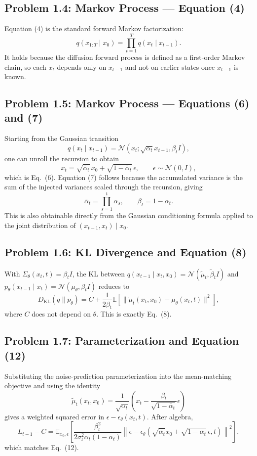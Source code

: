 \documentclass[11pt]{article}
\begin{document}
\subsection*{Problem 1.4: Markov Process --- Equation (4)}
Equation (4) is the standard forward Markov factorization:
\[
q(x_{1:T}\mid x_0)=\prod_{t=1}^T q(x_t\mid x_{t-1}).
\]
It holds because the diffusion forward process is defined as a first-order Markov chain, so each $x_t$ depends only on $x_{t-1}$ and not on earlier states once $x_{t-1}$ is known.

\subsection*{Problem 1.5: Markov Process --- Equations (6) and (7)}
Starting from the Gaussian transition
\[
q(x_t\mid x_{t-1})=\mathcal{N}(x_t;\sqrt{\alpha_t}x_{t-1},\beta_t I),
\]
one can unroll the recursion to obtain
\[
x_t=\sqrt{\bar\alpha_t}\,x_0+\sqrt{1-\bar\alpha_t}\,\epsilon,\qquad \epsilon\sim\mathcal{N}(0,I),
\]
which is Eq.\ (6). Equation (7) follows because the accumulated variance is the sum of the injected variances scaled through the recursion, giving
\[
\bar\alpha_t=\prod_{s=1}^t \alpha_s,\qquad \beta_t=1-\alpha_t.
\]
This is also obtainable directly from the Gaussian conditioning formula applied to the joint distribution of $(x_{t-1},x_t)\mid x_0$.

\subsection*{Problem 1.6: KL Divergence and Equation (8)}
With $\Sigma_\theta(x_t,t)=\beta_t I$, the KL between $q(x_{t-1}\mid x_t,x_0)=\mathcal{N}(\tilde\mu_t,\tilde\beta_t I)$ and $p_\theta(x_{t-1}\mid x_t)=\mathcal{N}(\mu_\theta,\beta_t I)$ reduces to
\[
D_{\mathrm{KL}}(q\|p_\theta)
= C + \frac{1}{2\beta_t}\mathbb{E}\left[\|\tilde\mu_t(x_t,x_0)-\mu_\theta(x_t,t)\|^2\right],
\]
where $C$ does not depend on $\theta$. This is exactly Eq.\ (8).

\subsection*{Problem 1.7: Parameterization and Equation (12)}
Substituting the noise-prediction parameterization into the mean-matching objective and using the identity
\[
\tilde\mu_t(x_t,x_0)=\frac{1}{\sqrt{\alpha_t}}\left(x_t-\frac{\beta_t}{\sqrt{1-\bar\alpha_t}}\epsilon\right)
\]
gives a weighted squared error in $\epsilon-\epsilon_\theta(x_t,t)$. After algebra,
\[
L_{t-1}-C
= \mathbb{E}_{x_0,\epsilon}\left[
\frac{\beta_t^2}{2\sigma_t^2 \alpha_t(1-\bar\alpha_t)}
\left\|\epsilon-\epsilon_\theta\!\left(\sqrt{\bar\alpha_t}x_0+\sqrt{1-\bar\alpha_t}\,\epsilon,t\right)\right\|^2
\right],
\]
which matches Eq.\ (12).
\end{document}
